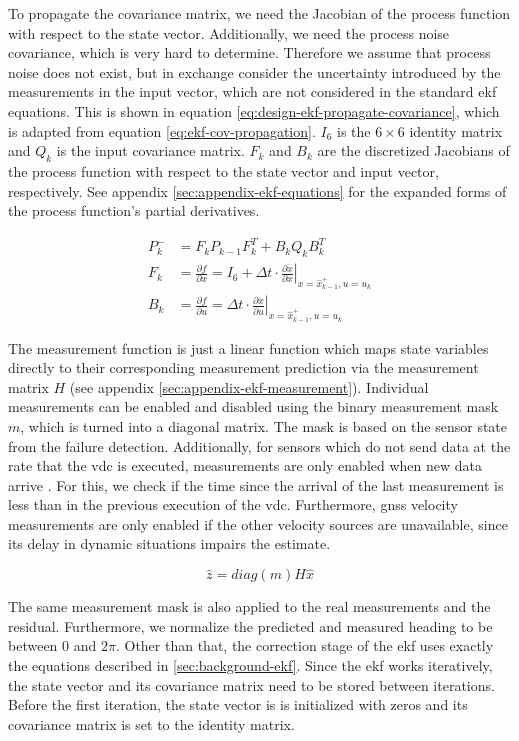 To propagate the covariance matrix, we need the Jacobian of the process function with respect to the state vector. Additionally, we need the process noise covariance, which is very hard to determine. Therefore we assume that process noise does not exist, but in exchange consider the uncertainty introduced by the measurements in the input vector, which are not considered in the standard \gls{ekf} equations. This is shown in equation \ref{eq:design-ekf-propagate-covariance}, which is adapted from equation \ref{eq:ekf-cov-propagation}. $I_6$ is the $6 \times 6$ identity matrix and $Q_k$ is the input covariance matrix. $F_k$ and $B_k$ are the discretized Jacobians of the process function with respect to the state vector and input vector, respectively. See appendix \ref{sec:appendix-ekf-equations} for the expanded forms of the process function's partial derivatives.

\begin{subequations}\label{eq:design-ekf-propagate-covariance}
\begin{alignat}{2}%
P_k^- &= F_k P_{k-1} F_k^T + B_k Q_k B_k^T \\%
F_k &= \frac{\partial f}{\partial x} = I_6 + \Delta t \cdot \left. \frac{\partial \dot{x}}{\partial x} \right|_{x = \hat{x}_{k-1}^+, u=u_k} \\%
B_k &= \frac{\partial f}{\partial u} = \Delta t \cdot \left. \frac{\partial \dot{x}}{\partial u} \right|_{x = \hat{x}_{k-1}^+, u=u_k}
\end{alignat}
\end{subequations}


The measurement function is just a linear function which maps state variables directly to their corresponding measurement prediction via the measurement matrix $H$ (see appendix \ref{sec:appendix-ekf-measurement}). Individual measurements can be enabled and disabled using the binary measurement mask $m$, which is turned into a diagonal matrix. The mask is based on the sensor state from the failure detection. Additionally, for sensors which do not send data at the rate that the \gls{vdc} is executed, measurements are only enabled when new data arrive
. For this, we check if the time since the arrival of the last measurement is less than in the previous execution of the \gls{vdc}. Furthermore, \gls{gnss} velocity measurements are only enabled if the other velocity sources are unavailable, since its delay in dynamic situations impairs the estimate.

\begin{equation}
\hat{z} = \textit{diag}(m) H \hat{x}
\end{equation}

The same measurement mask is also applied to the real measurements and the residual. Furthermore, we normalize the predicted and measured heading to be between $0$ and $2\pi$. Other than that, the correction stage of the \gls{ekf} uses exactly the equations described in \ref{sec:background-ekf}. Since the \gls{ekf} works iteratively, the state vector and its covariance matrix need to be stored between iterations. Before the first iteration, the state vector is is initialized with zeros and its covariance matrix is set to the identity matrix.
